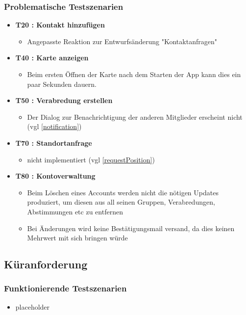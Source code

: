 \documentclass[parskip=full,11pt]{scrartcl}
\begin{document}
		\subsubsection{Problematische Testszenarien}
			\begin{itemize}
				\item \textbf{T20 : Kontakt hinzufügen}
					\begin{itemize}
						\item Angepasste Reaktion zur Entwurfsänderung "Kontaktanfragen"
					\end{itemize}
				\item \textbf{T40 : Karte anzeigen}
					\begin{itemize}
						\item Beim ersten Öffnen der Karte nach dem Starten der App kann
									dies ein paar Sekunden dauern.
						\end{itemize}
				\item \textbf{T50 : Verabredung erstellen}
					\begin{itemize}
						\item Der Dialog zur Benachrichtigung der anderen Mitglieder
									erscheint nicht (vgl \ref{notification})
					\end{itemize}
				\item \textbf{T70 : Standortanfrage}
					\begin{itemize}
						\item nicht implementiert (vgl \ref{requestPosition})
					\end{itemize}
				\item \textbf{T80 : Kontoverwaltung}
					\begin{itemize}
          	\item Beim Löschen eines Accounts werden nicht die nötigen Updates
                	produziert, um diesen aus all seinen Gruppen, Verabredungen,
                	Abstimmungen etc zu entfernen
          	\item Bei Änderungen wird keine Bestätigungsmail versand, da dies
									keinen Mehrwert mit sich bringen würde
					\end{itemize}
				\end{itemize}

	\subsection{Küranforderung}
		\subsubsection{Funktionierende Testszenarien}
			\begin{itemize}
				\item placeholder
	\end{itemize}
\end{document}
